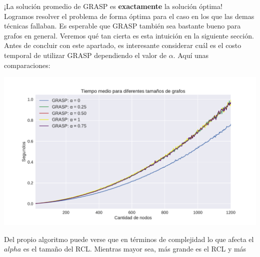 ¡La solución promedio de GRASP es \textbf{exactamente} la solución óptima! \\

Logramos resolver el problema de forma óptima para el caso en los que las demas técnicas fallaban. Es esperable que GRASP también sea bastante bueno para grafos en general. Veremos qué tan cierta es esta intuición en la siguiente sección. \\

Antes de concluir con este apartado, es interesante considerar cuál es el costo temporal de utilizar GRASP dependiendo el valor de $\alpha$. Aquí unas comparaciones:

{\centering
    \includegraphics[width=1\textwidth]{informe/imgs/exp_malo_tiempo_grasp.pdf}
}

Del propio algoritmo puede verse que en términos de complejidad lo que afecta el $alpha$ es el tamaño del RCL. Mientras mayor sea, más grande es el RCL y más 